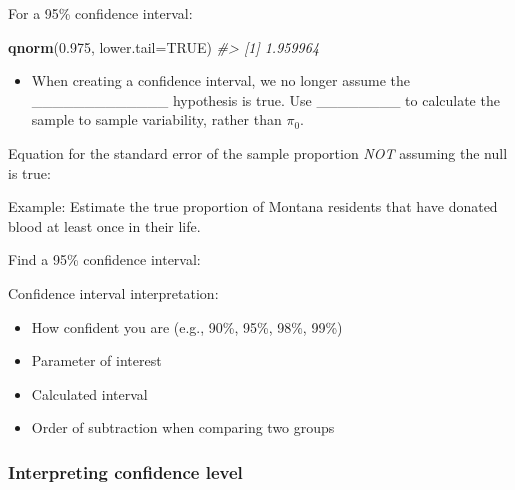 \documentclass[
]{report}
\newenvironment{Shaded}{\begin{snugshade}}{\end{snugshade}}
\newcommand{\AttributeTok}[1]{\textcolor[rgb]{0.13,0.29,0.53}{#1}}
\newcommand{\CommentTok}[1]{\textcolor[rgb]{0.56,0.35,0.01}{\textit{#1}}}
\newcommand{\ConstantTok}[1]{\textcolor[rgb]{0.56,0.35,0.01}{#1}}
\newcommand{\FloatTok}[1]{\textcolor[rgb]{0.00,0.00,0.81}{#1}}
\newcommand{\FunctionTok}[1]{\textcolor[rgb]{0.13,0.29,0.53}{\textbf{#1}}}
\newcommand{\NormalTok}[1]{#1}
\providecommand{\tightlist}{%
  \setlength{\itemsep}{0pt}\setlength{\parskip}{0pt}}
\begin{document}
For a 95\% confidence interval:

\begin{Shaded}
\begin{Highlighting}[]
\FunctionTok{qnorm}\NormalTok{(}\FloatTok{0.975}\NormalTok{, }\AttributeTok{lower.tail=}\ConstantTok{TRUE}\NormalTok{)}
\CommentTok{\#\textgreater{} [1] 1.959964}
\end{Highlighting}
\end{Shaded}


\begin{itemize}
\tightlist
\item
  When creating a confidence interval, we no longer assume the \_\_\_\_\_\_\_\_\_\_\_\_\_ hypothesis is true. Use \_\_\_\_\_\_\_\_ to calculate the sample to sample variability, rather than \(\pi_0\).
\end{itemize}


Equation for the standard error of the sample proportion \emph{NOT} assuming the null is true:

\vspace{0.5in}

\newpage

Example: Estimate the true proportion of Montana residents that have donated blood at least once in their life.

Find a 95\% confidence interval:

\vspace{1in}

Confidence interval interpretation:

\begin{itemize}
\item
  How confident you are (e.g., 90\%, 95\%, 98\%, 99\%)
\item
  Parameter of interest
\item
  Calculated interval
\item
  Order of subtraction when comparing two groups
\end{itemize}

\vspace{0.8in}

\hypertarget{interpreting-confidence-level}{%
\subsubsection*{Interpreting confidence level}\label{interpreting-confidence-level}}
\end{document}

